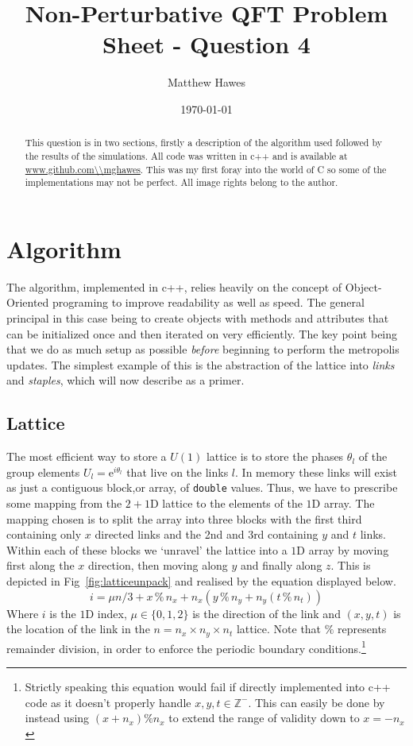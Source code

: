 \documentclass[12pt]{article}
\title{Non-Perturbative QFT Problem Sheet - Question 4}
\author{Matthew Hawes}
\date{\today}
\begin{document}
\maketitle

\begin{abstract}
This question is in two sections, firstly a description of the algorithm used followed by the results of the simulations. All code was written in c++ and is available at \url{www.github.com\\mghawes}. This was my first foray into the world of C so some of the implementations may not be perfect. All image rights belong to the author.
\end{abstract}

\section{Algorithm}
The algorithm, implemented in c++, relies heavily on the concept of Object-Oriented programing to improve readability as well as speed. The general principal in this case being to create objects with methods and attributes that can be initialized once and then iterated on very efficiently. The key point being that we do as much setup as possible \emph{before} beginning to perform the metropolis updates. The simplest example of this is the abstraction of the lattice into \emph{links} and \emph{staples}, which will now describe as a primer.

\subsection{Lattice}
\label{sec:lattice}
The most efficient way to store a $U(1)$ lattice is to store the phases $\theta_l$ of the group elements $U_l = \mathrm{e}^{i\theta_l}$ that live on the links $l$. In memory these links will exist as just a contiguous block,or array, of \texttt{double} values. Thus, we have to prescribe some mapping from the $2+1\mathrm{D}$ lattice to the elements of the $1\mathrm{D}$ array. The mapping chosen is to split the array into three blocks with the first third containing only $x$ directed links and the 2nd and 3rd containing $y$ and $t$ links. Within each of these blocks we `unravel' the lattice into a $1\mathrm{D}$ array by moving first along the $x$ direction, then moving along $y$ and finally along $z$. This is depicted in Fig~\ref{fig:latticeunpack} and realised by the equation displayed below.
\begin{equation}
    i = \mu n/3  +  x \, \% \, n_x + n_x \left(  y \, \% \, n_y + n_y \left( t \, \% \, n_t \right) \right)
\end{equation}
Where $i$ is the $1\mathrm{D}$ index, $\mu \in \{0,1,2\}$ is the direction of the link and $(x,y,t)$ is the location of the link in the $n=n_x\times n_y \times n_t$ lattice. Note that $\%$ represents remainder division, in order to enforce the periodic boundary conditions.\footnote{Strictly speaking this equation would fail if directly implemented into c++ code as it doesn't properly handle $x,y,t \in \mathbb{Z}^-$. This can easily be done by instead using $ (x+n_x) \% n_x$ to extend the range of validity down to $x=-n_x$}
\end{document}
